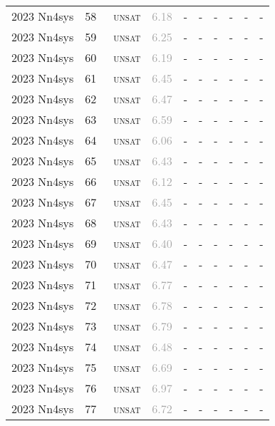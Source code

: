 \begin{center}
{\begin{longtable}{@{}llllllllll@{}}
2023 Nn4sys & 58 & ~\textsc{unsat} & \textcolor{darkgray}{6.18} & - & - & - & - & - & - \\
2023 Nn4sys & 59 & ~\textsc{unsat} & \textcolor{darkgray}{6.25} & - & - & - & - & - & - \\
2023 Nn4sys & 60 & ~\textsc{unsat} & \textcolor{darkgray}{6.19} & - & - & - & - & - & - \\
2023 Nn4sys & 61 & ~\textsc{unsat} & \textcolor{darkgray}{6.45} & - & - & - & - & - & - \\
2023 Nn4sys & 62 & ~\textsc{unsat} & \textcolor{darkgray}{6.47} & - & - & - & - & - & - \\
2023 Nn4sys & 63 & ~\textsc{unsat} & \textcolor{darkgray}{6.59} & - & - & - & - & - & - \\
2023 Nn4sys & 64 & ~\textsc{unsat} & \textcolor{darkgray}{6.06} & - & - & - & - & - & - \\
2023 Nn4sys & 65 & ~\textsc{unsat} & \textcolor{darkgray}{6.43} & - & - & - & - & - & - \\
2023 Nn4sys & 66 & ~\textsc{unsat} & \textcolor{darkgray}{6.12} & - & - & - & - & - & - \\
2023 Nn4sys & 67 & ~\textsc{unsat} & \textcolor{darkgray}{6.45} & - & - & - & - & - & - \\
2023 Nn4sys & 68 & ~\textsc{unsat} & \textcolor{darkgray}{6.43} & - & - & - & - & - & - \\
2023 Nn4sys & 69 & ~\textsc{unsat} & \textcolor{darkgray}{6.40} & - & - & - & - & - & - \\
2023 Nn4sys & 70 & ~\textsc{unsat} & \textcolor{darkgray}{6.47} & - & - & - & - & - & - \\
2023 Nn4sys & 71 & ~\textsc{unsat} & \textcolor{darkgray}{6.77} & - & - & - & - & - & - \\
2023 Nn4sys & 72 & ~\textsc{unsat} & \textcolor{darkgray}{6.78} & - & - & - & - & - & - \\
2023 Nn4sys & 73 & ~\textsc{unsat} & \textcolor{darkgray}{6.79} & - & - & - & - & - & - \\
2023 Nn4sys & 74 & ~\textsc{unsat} & \textcolor{darkgray}{6.48} & - & - & - & - & - & - \\
2023 Nn4sys & 75 & ~\textsc{unsat} & \textcolor{darkgray}{6.69} & - & - & - & - & - & - \\
2023 Nn4sys & 76 & ~\textsc{unsat} & \textcolor{darkgray}{6.97} & - & - & - & - & - & - \\
2023 Nn4sys & 77 & ~\textsc{unsat} & \textcolor{darkgray}{6.72} & - & - & - & - & - & - \\

\end{longtable}}
\end{center}
